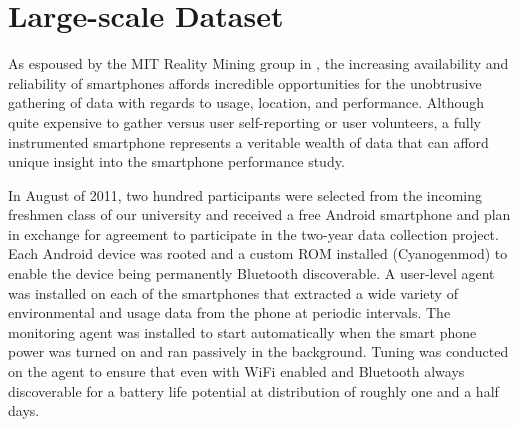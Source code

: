 %
%
%
%
%
%
%
%

%
%

\chapter{Large-scale Dataset}
\label{chap:dataset}
As espoused by the MIT Reality Mining group in \cite{Nathan3,Nathan1}, the increasing availability and reliability of smartphones affords incredible opportunities for the unobtrusive gathering of data with regards to usage, location, and performance.  Although quite expensive to gather versus user self-reporting or user volunteers, a fully instrumented smartphone represents a veritable wealth of data that can afford unique insight into the smartphone performance study.

In August of 2011, two hundred participants were selected from the incoming freshmen class of our university and received a free Android smartphone and plan in exchange for agreement to participate in the two-year data collection project.  Each Android device was rooted and a custom ROM installed (Cyanogenmod) to enable the device being permanently Bluetooth discoverable. A user-level agent was installed on each of the smartphones that extracted a wide variety of environmental and usage data from the phone at periodic intervals.  The monitoring agent was installed to start automatically when the smart phone power was turned on and ran passively in the background. Tuning was conducted on the agent to ensure that even with WiFi enabled and Bluetooth always discoverable for a battery life potential at distribution of roughly one and a half days.  

